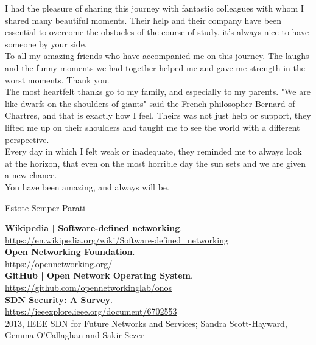 \documentclass[a4paper,10pt]{memoir}
\begin{document}
{I had the pleasure of sharing this journey with fantastic colleagues with whom I shared many beautiful moments. Their help and their company have been essential to overcome the obstacles of the course of study, it's always nice to have someone by your side.\\

To all my amazing friends who have accompanied me on this journey. The laughs and the funny moments we had together helped me and gave me strength in the worst moments. Thank you.\\

The most heartfelt thanks go to my family, and especially to my parents. 
"We are like dwarfs on the shoulders of giants" said the French philosopher Bernard of Chartres, and that is exactly how I feel. 
Theirs was not just help or support, they lifted me up on their shoulders and taught me to see the world with a different perspective.\\
Every day in which I felt weak or inadequate, they reminded me to always look at the horizon, that even on the most horrible day the sun sets and we are given a new chance.\\
You have been amazing, and always will be.\\

\bigskip

Estote Semper Parati



\begin{thebibliography}{9}

  \textbf{Wikipedia | Software-defined networking}.\\
  \href{https://en.wikipedia.org/wiki/Software-defined_networking}{https://en.wikipedia.org/wiki/Software-defined\_networking}\\

  \textbf{Open Networking Foundation}.\\
  \href{https://opennetworking.org/}{https://opennetworking.org/}\\

  \textbf{GitHub | Open Network Operating System}.\\
  \href{https://github.com/opennetworkinglab/onos}{https://github.com/opennetworkinglab/onos}\\

  \textbf{SDN Security: A Survey}.\\
  \href{https://ieeexplore.ieee.org/document/6702553}{https://ieeexplore.ieee.org/document/6702553}\\
  2013, IEEE SDN for Future Networks and Services; Sandra Scott-Hayward, Gemma O’Callaghan and Sakir Sezer


\end{thebibliography}}
\end{document}
